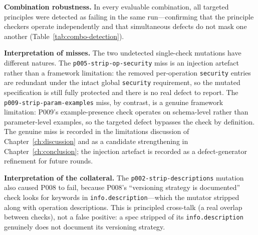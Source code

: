 \textbf{Combination robustness.} In every evaluable combination, all targeted principles were detected as failing in the same run---confirming that the principle checkers operate independently and that simultaneous defects do not mask one another (Table~\ref{tab:combo-detection}).

\begin{table}[htbp]
\centering
\caption{Combination defect-injection results: simultaneous mutations on the \texttt{non-critical-api} baseline.}
\label{tab:combo-detection}
\small
{}
\end{table}

\textbf{Interpretation of misses.} The two undetected single-check mutations have different natures. The \texttt{p005-strip-op-security} miss is an injection artefact rather than a framework limitation: the removed per-operation \texttt{security} entries are redundant under the intact global \texttt{security} requirement, so the mutated specification is still fully protected and there is no real defect to report. The \texttt{p009-strip-param-examples} miss, by contrast, is a genuine framework limitation: P009's example-presence check operates on schema-level rather than parameter-level examples, so the targeted defect bypasses the check by definition. The genuine miss is recorded in the limitations discussion of Chapter~\ref{ch:discussion} and as a candidate strengthening in Chapter~\ref{ch:conclusion}; the injection artefact is recorded as a defect-generator refinement for future rounds.

\textbf{Interpretation of the collateral.} The \texttt{p002-strip-descriptions} mutation also caused P008 to fail, because P008's ``versioning strategy is documented'' check looks for keywords in \texttt{info.description}---which the mutator stripped along with operation descriptions. This is principled cross-talk (a real overlap between checks), not a false positive: a spec stripped of its \texttt{info.description} genuinely does not document its versioning strategy.

